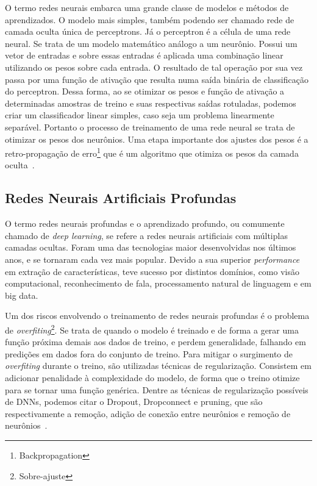 O termo redes neurais embarca uma grande classe de modelos e métodos de aprendizados. O
modelo mais simples, também podendo ser chamado rede de camada oculta única de
perceptrons. Já o  perceptron é a célula de uma rede neural. Se trata de um modelo
matemático análogo a um neurônio. Possui um vetor de entradas e sobre essas entradas é
aplicada uma combinação linear utilizando os pesos sobre cada entrada. O resultado de tal
operação por sua vez passa por uma função de ativação que resulta numa saída binária de
classificação do perceptron. Dessa forma, ao se otimizar os pesos e função de ativação a
determinadas amostras de treino e suas respectivas saídas rotuladas, podemos criar um
classificador linear simples, caso seja um problema linearmente separável. Portanto o
processo de treinamento de uma rede neural se trata de otimizar os pesos dos neurônios.
Uma etapa importante dos ajustes dos pesos é a retro-propagação de
erro\footnote{Backpropagation} que é um algoritmo que otimiza os pesos da camada
oculta~\cite{hastie01statisticallearning}.

\subsection{Redes Neurais Artificiais Profundas}\label{sec:Cap2_redes_neurais_profundas}
O termo redes neurais profundas e o aprendizado profundo, ou comumente chamado de \textit{deep learning}, se refere a redes neurais artificiais com múltiplas camadas ocultas. Foram uma das tecnologias maior desenvolvidas nos últimos anos, e se tornaram cada vez mais popular. Devido a sua superior \textit{performance} em extração de características, teve sucesso por distintos domínios, como visão computacional, reconhecimento de fala, processamento natural de linguagem e em big data.

Um dos riscos envolvendo o treinamento de redes neurais profundas é o problema de \textit{overfiting}\footnote{Sobre-ajuste}. Se trata de quando o modelo é treinado e de forma a gerar uma função próxima demais aos dados de treino, e perdem generalidade, falhando em predições em dados fora do conjunto de treino. Para mitigar o surgimento de \textit{overfiting} durante o treino, são utilizadas técnicas de regularização. Consistem em adicionar penalidade à complexidade do modelo, de forma que o treino otimize para se tornar uma função genérica. Dentre as técnicas de regularização possíveis de DNNs, podemos citar o Dropout, Dropconnect e pruning, que são respectivamente a remoção, adição de conexão entre neurônios e remoção de neurônios~\cite{hastie01statisticallearning}.


